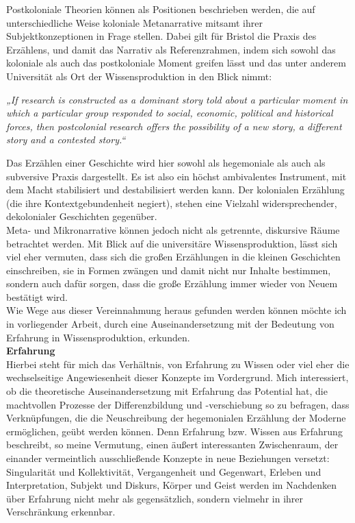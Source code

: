 \noindent Postkoloniale Theorien können als Positionen beschrieben werden, die  auf
unterschiedliche Weise  koloniale Metanarrative mitsamt ihrer
Subjektkonzeptionen in Frage stellen. Dabei gilt für Bristol die Praxis des
Erzählens, und damit das Narrativ als Referenzrahmen, indem sich sowohl das
koloniale als auch das postkoloniale Moment greifen lässt und das unter anderem
Universität als Ort der Wissensproduktion in den Blick nimmt:
\begin{myenv} \textit{  „If research is constructed as a dominant story told
    about a particular moment in which a particular group responded to social,
    economic, political and historical forces, then postcolonial research
    offers the possibility of a new story, a different story and a contested
story.“\footnotemark {} } \end{myenv}
Das Erzählen einer Geschichte wird hier sowohl als hegemoniale als auch als
subversive Praxis dargestellt. Es ist also ein höchst ambivalentes Instrument,
mit dem Macht stabilisiert und destabilisiert werden kann. Der kolonialen
Erzählung (die ihre Kontextgebundenheit negiert), stehen eine Vielzahl
widersprechender, dekolonialer Geschichten gegenüber.\\

\noindent Meta- und Mikronarrative können jedoch nicht als getrennte, diskursive Räume
betrachtet werden. Mit Blick auf die universitäre Wissensproduktion, lässt sich
viel eher vermuten, dass sich die großen Erzählungen in die kleinen Geschichten
einschreiben, sie in Formen zwängen und damit nicht nur Inhalte bestimmen,
sondern auch dafür sorgen, dass die große Erzählung immer wieder von Neuem
bestätigt wird.\\
Wie Wege aus dieser Vereinnahmung heraus gefunden werden können möchte ich in vorliegender Arbeit, durch eine Auseinandersetzung mit der Bedeutung von Erfahrung in Wissensproduktion, erkunden.\\

\noindent\textbf{\large Erfahrung}\\
Hierbei steht für mich das Verhältnis, von Erfahrung zu Wissen oder viel eher
die wechselseitige Angewiesenheit dieser Konzepte im Vordergrund. Mich
interessiert, ob die theoretische Auseinandersetzung mit Erfahrung das
Potential hat, die machtvollen Prozesse der Differenzbildung und -verschiebung
so zu befragen, dass Verknüpfungen, die die Neuschreibung der hegemonialen
Erzählung der Moderne ermöglichen, geübt werden können. Denn Erfahrung bzw.
Wissen aus Erfahrung beschreibt, so meine Vermutung, einen äußert interessanten
Zwischenraum, der einander vermeintlich ausschließende Konzepte in neue
Beziehungen versetzt: \\
Singularität und Kollektivität, Vergangenheit und
Gegenwart, Erleben und Interpretation, Subjekt und Diskurs, Körper und Geist
werden im Nachdenken über Erfahrung nicht mehr als gegensätzlich, sondern
vielmehr in ihrer Verschränkung erkennbar.\\

